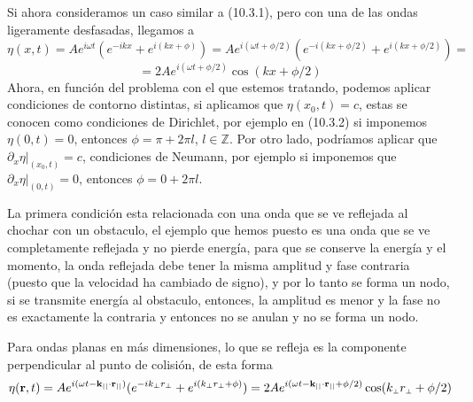 Si ahora consideramos un caso similar a (10.3.1), pero con una de las ondas ligeramente desfasadas, llegamos a
\[\eta(x,t) = A e^{i\omega t}(e^{-ikx}+e^{i(kx + \phi)}) = A e^{i(\omega t +\phi/2)} (e^{-i(kx+\phi/2)}+e^{i(kx + \phi/2)}) = \]
\begin{equation} \label{6.1.1}
    = 2A e^{i(\omega t +\phi/2)} \cos(kx+\phi/2)
\end{equation}
Ahora, en función del problema con el que estemos tratando, podemos aplicar condiciones de contorno distintas, si aplicamos que $\eta(x_0,t) = c$, estas se conocen como condiciones de Dirichlet, por ejemplo en (10.3.2) si imponemos $\eta(0,t) = 0$, entonces $\phi = \pi +2\pi l$, $l\in \mathbb{Z}$. Por otro lado, podríamos aplicar que $\partial_x \eta|_{(x_0,t)} =c$, condiciones de Neumann, por ejemplo si imponemos que $\partial_x \eta|_{(0,t)} =0$, entonces $\phi = 0 +2\pi l$.

La primera condición esta relacionada con una onda que se ve reflejada al chochar con un obstaculo, el ejemplo que hemos puesto es una onda que se ve completamente reflejada y no pierde energía, para que se conserve la energía y el momento, la onda reflejada debe tener la misma amplitud y fase contraria (puesto que la velocidad ha cambiado de signo), y por lo tanto se forma un nodo, si se transmite energía al obstaculo, entonces, la amplitud es menor y la fase no es exactamente la contraria y entonces no se anulan y no se forma un nodo.

Para ondas planas en más dimensiones, lo que se refleja es la componente perpendicular al punto de colisión, de esta forma
\begin{equation} \label{6.1.1}
\eta(\mathbf{r},t) = A e^{i(\omega t-\mathbf{k}_{\mbox{\tiny ||}}\cdot\mathbf{r}_{\mbox{\tiny ||}})}(e^{-ik_{\mbox{\tiny $\perp$}}r_{\mbox{\tiny $\perp$}}}+e^{i(k_{\mbox{\tiny $\perp$}}r_{\mbox{\tiny $\perp$}} + \phi)}) = 2A e^{i(\omega t -\mathbf{k}_{\mbox{\tiny ||}}\cdot\mathbf{r}_{\mbox{\tiny ||}} +\phi/2)} \cos(k_{\mbox{\tiny $\perp$}}r_{\mbox{\tiny $\perp$}} +\phi/2)
\vspace{-25pt}
\end{equation}
